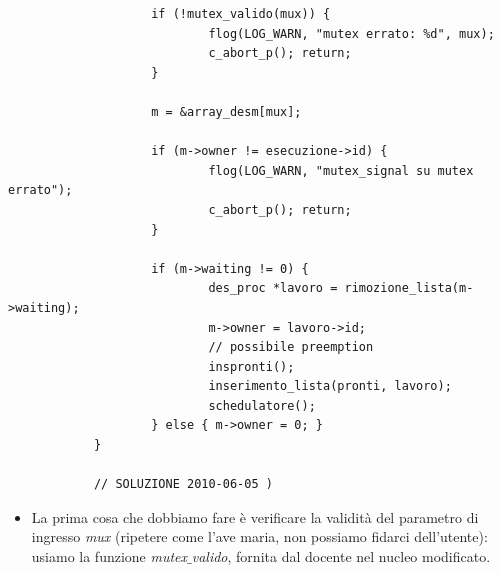 \documentclass[11pt]{report}
\theoremstyle{definition}
\begin{document}
\begin{itemize}
\begin{verbatim}
				    if (!mutex_valido(mux)) {
					        flog(LOG_WARN, "mutex errato: %d", mux);
					        c_abort_p(); return;
				    }
			    
				    m = &array_desm[mux];
				
				    if (m->owner != esecuzione->id) {
					        flog(LOG_WARN, "mutex_signal su mutex errato");
					        c_abort_p(); return;
				    }
				
				    if (m->waiting != 0) {
					        des_proc *lavoro = rimozione_lista(m->waiting);
					        m->owner = lavoro->id;
					        // possibile preemption
					        inspronti();
					        inserimento_lista(pronti, lavoro);
					        schedulatore();
				    } else { m->owner = 0; }
			}
			
			// SOLUZIONE 2010-06-05 )
		\end{verbatim}
		\begin{itemize}
			\item La prima cosa che dobbiamo fare è verificare la validità del parametro di ingresso \emph{mux} (ripetere come l'ave maria, non possiamo fidarci dell'utente): usiamo la funzione \emph{mutex$\_$valido}, fornita dal docente nel nucleo modificato.
			

\end{itemize}
\end{itemize}
\end{document}
